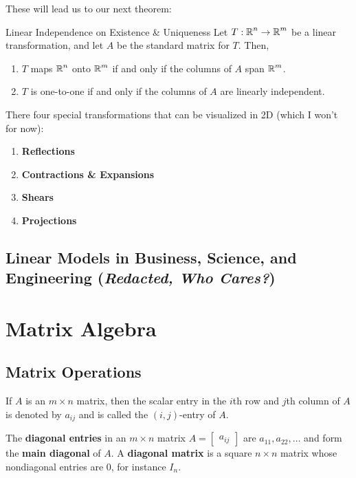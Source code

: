 \documentclass{article}
\begin{document}
These will lead us to our next theorem:

\begin{theorem}{Linear Independence on Existence \& Uniqueness}
	Let $T: \operatorname{\mathbb{R}}^n \to \operatorname{\mathbb{R}}^m$ be a linear transformation, and let $A$ be the standard matrix for $T$. Then,

	\begin{enumerate}[label=\alph*)]
		\item
		      $T$ maps $\operatorname{\mathbb{R}}^n$ onto $\operatorname{\mathbb{R}}^m$ if and only if the columns of $A$ span $\operatorname{\mathbb{R}}^m$.
		\item
		      $T$ is one-to-one if and only if the columns of $A$ are linearly independent.
	\end{enumerate}
\end{theorem}

There four special transformations that can be visualized in 2D (which I won't for now):

\begin{enumerate}[label=\alph*)]
	\item
	      \textbf{Reflections}
	\item
	      \textbf{Contractions \& Expansions}
	\item
	      \textbf{Shears}
	\item
	      \textbf{Projections}
\end{enumerate}

\subsection{Linear Models in Business, Science, and Engineering (\emph{Redacted, Who Cares?})}

\section{Matrix Algebra}

\subsection{Matrix Operations}
If $A$ is an $m \times n$ matrix, then the scalar entry in the $i$th row and $j$th column of $A$ is denoted by $a_{ij}$ and is called the $(i, j)$-entry of $A$.

The \textbf{diagonal entries} in an $m \times n$ matrix $A =  \begin{bmatrix} a_{ij} \end{bmatrix}$ are $a_{11}, a_{22}, \ldots$ and form the \textbf{main diagonal} of $A$. A \textbf{diagonal matrix} is a square $n \times n$ matrix whose nondiagonal entries are $0$, for instance $I_n$.
\end{document}

